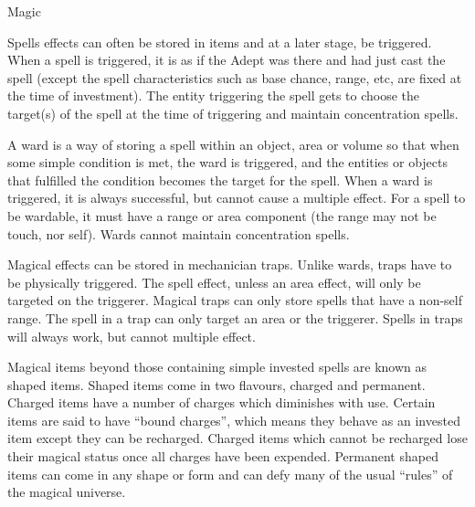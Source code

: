 \begin{Chapter}{Magic}
\begin{Description}
\item[Investment] Spells effects can often be stored in items and at a
  later stage, be triggered.  When a spell is triggered, it is as if
  the Adept was there and had just cast the spell (except the spell
  characteristics such as base chance, range, etc, are fixed at the
  time of investment). The entity triggering the spell gets to choose
  the target(s) of the spell at the time of triggering and maintain
  concentration spells.

\item[Ward] A ward is a way of storing a spell within an object, area
  or volume so that when some simple condition is met, the ward is
  triggered, and the entities or objects that fulfilled the condition
  becomes the target for the spell.  When a ward is triggered, it is
  always successful, but cannot cause a multiple effect. For a spell
  to be wardable, it must have a range or area component (the range
  may not be touch, nor self). Wards cannot maintain concentration
  spells.

\item[Magical Trap] Magical effects can be stored in mechanician
  traps.  Unlike wards, traps have to be physically triggered.  The
  spell effect, unless an area effect, will only be targeted on the
  triggerer.  Magical traps can only store spells that have a non-self
  range.  The spell in a trap can only target an area or the
  triggerer.  Spells in traps will always work, but cannot multiple
  effect.

\item[Shaped Magic] Magical items beyond those containing simple
  invested spells are known as shaped items. Shaped items come in two
  flavours, charged and permanent.  Charged items have a number of
  charges which diminishes with use.  Certain items are said to have
  “bound charges”, which means they behave as an invested item except
  they can be recharged.  Charged items which cannot be recharged lose
  their magical status once all charges have been expended.  Permanent
  shaped items can come in any shape or form and can defy many of the
  usual “rules” of the magical universe.

\end{Description}

\end{Chapter}
